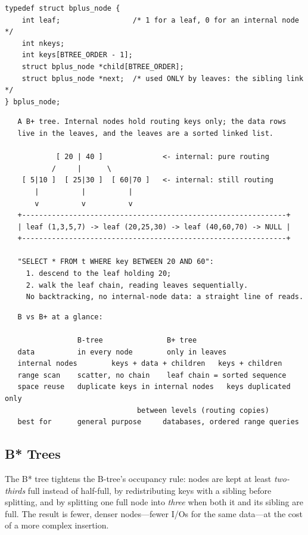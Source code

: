 \begin{lstlisting}[caption={The B+ leaf adds a sibling pointer.}]
typedef struct bplus_node {
    int leaf;                 /* 1 for a leaf, 0 for an internal node */
    int nkeys;
    int keys[BTREE_ORDER - 1];
    struct bplus_node *child[BTREE_ORDER];
    struct bplus_node *next;  /* used ONLY by leaves: the sibling link */
} bplus_node;
\end{lstlisting}

\begin{verbatim}
   A B+ tree. Internal nodes hold routing keys only; the data rows
   live in the leaves, and the leaves are a sorted linked list.

            [ 20 | 40 ]              <- internal: pure routing
           /     |      \
    [ 5|10 ]  [ 25|30 ]  [ 60|70 ]   <- internal: still routing
       |          |          |
       v          v          v
   +--------------------------------------------------------------+
   | leaf (1,3,5,7) -> leaf (20,25,30) -> leaf (40,60,70) -> NULL |
   +--------------------------------------------------------------+

   "SELECT * FROM t WHERE key BETWEEN 20 AND 60":
     1. descend to the leaf holding 20;
     2. walk the leaf chain, reading leaves sequentially.
     No backtracking, no internal-node data: a straight line of reads.
\end{verbatim}

\begin{verbatim}
   B vs B+ at a glance:

                 B-tree               B+ tree
   data          in every node        only in leaves
   internal nodes        keys + data + children   keys + children
   range scan    scatter, no chain    leaf chain = sorted sequence
   space reuse   duplicate keys in internal nodes   keys duplicated only
                               between levels (routing copies)
   best for      general purpose     databases, ordered range queries
\end{verbatim}

\subsection{B* Trees}

The B* tree tightens the B-tree's occupancy rule: nodes are kept at
least \emph{two-thirds} full instead of half-full, by redistributing
keys with a sibling before splitting, and by splitting one full node
into \emph{three} when both it and its sibling are full. The result is
fewer, denser nodes---fewer I/Os for the same data---at the cost of a
more complex insertion.

